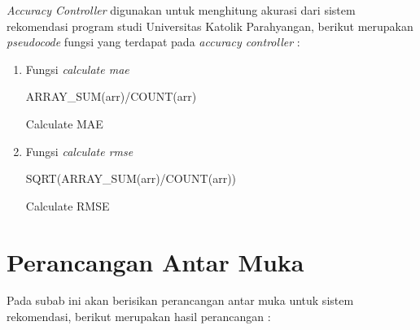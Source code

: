 \textit{Accuracy Controller} digunakan untuk menghitung akurasi dari sistem rekomendasi program studi Universitas Katolik Parahyangan, berikut merupakan \textit{pseudocode} fungsi yang terdapat pada \textit{accuracy controller} :

\begin{enumerate}
    \item Fungsi \textit{calculate mae}\\
    
        \begin{algorithm}[H]
            \begin{algorithmic}[1]
                   \State \Return ARRAY\_SUM(arr)/COUNT(arr)
                \EndProcedure
            \end{algorithmic} 
            \caption{Calculate MAE}
            \label{alg:calculateMAE}
        \end{algorithm}
    
    \item Fungsi \textit{calculate rmse}\\
    
        \begin{algorithm}[H]
            \begin{algorithmic}[1]
                   \State \Return SQRT(ARRAY\_SUM(arr)/COUNT(arr))
                \EndProcedure
            \end{algorithmic} 
            \caption{Calculate RMSE}
            \label{alg:calculateRMSE}
        \end{algorithm}
\end{enumerate}

\section{Perancangan Antar Muka}
\label{sec:perancangan antar muka}

Pada subab ini akan berisikan perancangan antar muka untuk sistem rekomendasi, berikut merupakan hasil perancangan :

